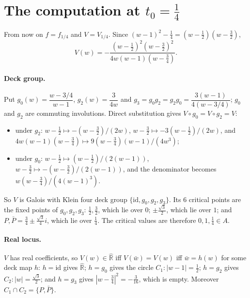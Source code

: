 \documentclass[11pt]{article}
\theoremstyle{definition}
\newcommand{\Rh}{\hat{\mathbb R}}
\begin{document}
\section{The computation at \texorpdfstring{$t_0=\tfrac14$}{t0=1/4}}\label{sec:comp}

From now on $f=f_{1/4}$ and $V=V_{1/4}$. Since $(w-1)^2-\tfrac14=(w-\tfrac12)(w-\tfrac32)$,
\[V(w)=-\frac{(w-\frac12)^2(w-\frac32)^2}{4w(w-1)(w-\frac34)} .\]

\paragraph{Deck group.} Put $g_0(w)=\dfrac{w-3/4}{w-1}$, $g_2(w)=\dfrac3{4w}$ and $g_3=g_0g_2=g_2g_0=\dfrac{3(w-1)}{4(w-3/4)}$; $g_0$ and $g_2$ are commuting involutions. Direct substitution gives $V\circ g_0=V\circ g_2=V$:
\begin{itemize}[nosep]
\item under $g_2$: $w-\tfrac12\mapsto-(w-\tfrac32)/(2w)$, $w-\tfrac32\mapsto-3(w-\tfrac12)/(2w)$, and $4w(w-1)(w-\tfrac34)\mapsto 9(w-\tfrac34)(w-1)/(4w^3)$;
\item under $g_0$: $w-\tfrac12\mapsto(w-\tfrac12)/(2(w-1))$, $w-\tfrac32\mapsto-(w-\tfrac32)/(2(w-1))$, and the denominator becomes $w(w-\tfrac34)/(4(w-1)^3)$.
\end{itemize}
So $V$ is Galois with Klein four deck group $\{\mathrm{id},g_0,g_2,g_3\}$. Its $6$ critical points are the fixed points of $g_0,g_2,g_3$:
$\tfrac12,\tfrac32$, which lie over $0$; $\pm\tfrac{\sqrt3}2$, which lie over $1$; and $P,\bar P=\tfrac34\pm\tfrac{\sqrt3}4 i$, which lie over $\tfrac14$. The critical values are therefore $0,1,\tfrac14\in A$.
\paragraph{Real locus.} $V$ has real coefficients, so $V(w)\in\Rh$ iff $V(\bar w)=V(w)$ iff $\bar w=h(w)$ for some deck map $h$:
$h=\mathrm{id}$ gives $\Rh$; $h=g_0$ gives the circle $C_1\colon|w-1|=\tfrac12$; $h=g_2$ gives $C_2\colon|w|=\tfrac{\sqrt3}2$; and $h=g_3$ gives $|w-\tfrac34|^2=-\tfrac3{16}$, which is empty. Moreover $C_1\cap C_2=\{P,\bar P\}$.
\end{document}
